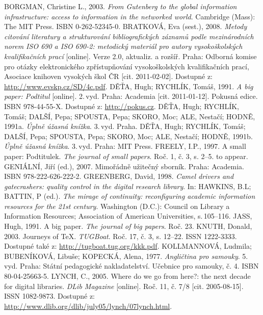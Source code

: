 \documentclass{article}
\begin{document}
\begin{thebibliography}{99}
  BORGMAN, Christine L., 2003. \emph{From Gutenberg to the global information infrastructure: access to information in the networked world}. Cambridge (Mass): The MIT Press. ISBN 0-262-52345-0.
  BRATKOVÁ, Eva (sest.), 2008. \emph{Metody citování literatury a strukturování bibliografických záznamů podle mezinárodních norem ISO 690 a ISO 690-2: metodický materiál pro autory vysokoškolských kvalifikačních prací} [online]. Verze 2.0, aktualiz. a rozšíř. Praha: Odborná komise pro otázky elektronického zpřístupňování vysokoškolských kvalifikačních prací, Asociace knihoven vysokých škol ČR [cit. 2011-02-02]. Dostupné z: \url{http://www.evskp.cz/SD/4c.pdf}.
  DĚŤA, Hugh; RYCHLÍK, Tomáš, 1991. \emph{A big paper: Podtitul} [online]. 2.\,vyd. Praha: Academia [cit. 2011-01-12]. Pokusná edice. ISBN 978-44-55-X. Dostupné z: \url{http://pokus.cz}.
  DĚŤA, Hugh; RYCHLÍK, Tomáš; DALŠÍ, Pepa; SPOUSTA, Pepa; SKORO, Moc; ALE, Nestačí; HODNĚ, 1991a. \emph{Úplně úžasná knížka}. 3.\,vyd. Praha.
  DĚŤA, Hugh; RYCHLÍK, Tomáš; DALŠÍ, Pepa; SPOUSTA, Pepa; SKORO, Moc; ALE, Nestačí; HODNĚ, 1991b. \emph{Úplně úžasná knížka}. 3.\,vyd. Praha: MIT Press.
  FREELY, I.P., 1997. A small paper: Podtitulek. \emph{The journal of small papers}. Roč. 1, č. 3, s. 2--5. to appear.
  GENIÁLNÍ, Jiří (ed.), 2007. Mimořádně užitečný sborník. Praha: Academia. ISBN 978-222-626-222-2.
  GREENBERG, David, 1998. \emph{Camel drivers and gatecrashers: quality control in the digital research library}. In: HAWKINS, B.L; BATTIN, P (ed.). \emph{The mirage of continuity: reconfiguring academic information resources for the 21st  century}. Washington (D.C.): Council on Library a Information Resources; Association of American Universities, s.\,105--116.
  JASS, Hugh, 1991. A big paper. \emph{The journal of big papers}. Roč. 23.
  KNUTH, Donald, 2003. Journeys of \TeX. \emph{TUGBoat}. Roč. 17, č. 3, s. 12--22. ISSN 1222-3333. Dostupné také z: \url{http://tugboat.tug.org/kkk.pdf}.
  KOLLMANNOVÁ, Ludmila; BUBENÍKOVÁ, Libuše; KOPECKÁ, Alena, 1977. \emph{Angličtina pro samouky}. 5. vyd. Praha: Státní pedagogické nakladatelství. Učebnice pro samouky, č. 4. ISBN 80-04-25663-5.
  LYNCH, C., 2005. Where do we go from here?: the next decade for digital libraries. \emph{DLib Magazine} [online]. Roč. 11, č. 7/8 [cit. 2005-08-15]. ISSN 1082-9873. Dostupné z: \url{http://www.dlib.org/dlib/july05/lynch/07lynch.html}.

\end{thebibliography}
\end{document}
